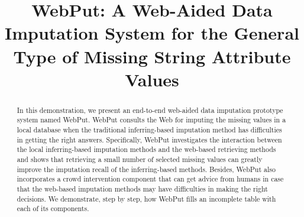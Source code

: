 \documentclass[sigconf]{acmart}
\begin{document}
\title{WebPut: A Web-Aided Data Imputation System for the General Type of Missing String Attribute Values}

%
%
%
%
%
%



\begin{abstract}
In this demonstration, we present an end-to-end web-aided data imputation prototype system named WebPut. WebPut consults the Web for imputing the missing values in a local database when the traditional inferring-based imputation method has difficulties in getting the right answers.
%
Specifically, WebPut investigates the interaction between the local inferring-based imputation methods and the web-based retrieving methods and shows that retrieving a small number of selected missing values can greatly improve the imputation recall of the inferring-based methods.
%
Besides, WebPut also incorporates a crowd intervention component that can get advice from humans in case that the web-based imputation methods may have difficulties in making the right decisions.
%
We demonstrate, step by step, how WebPut fills an incomplete table with each of its components. %
\end{abstract}
\end{document}
